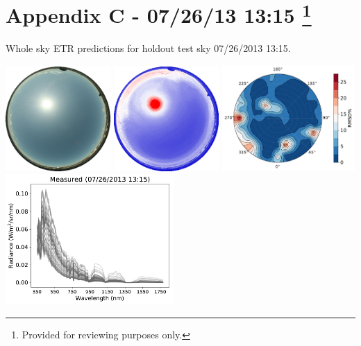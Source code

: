 \section*{Appendix C - 07/26/13 13:15 \footnote{Provided for reviewing purposes only.}}

\noindent
Whole sky ETR predictions for holdout test sky {07/26/2013 13:15}.\\%

\begin{center}
\includegraphics[width=0.30\textwidth]{img/07261315.jpg}
\includegraphics[width=0.30\textwidth]{img/07261315_sradmap.png}
\includegraphics[width=0.38\textwidth]{img/07261315_wholesky_full.pdf}\\
\vspace{0.26in}%
\includegraphics[width=0.48\textwidth]{img/07261315_measured.pdf}

\end{center}
